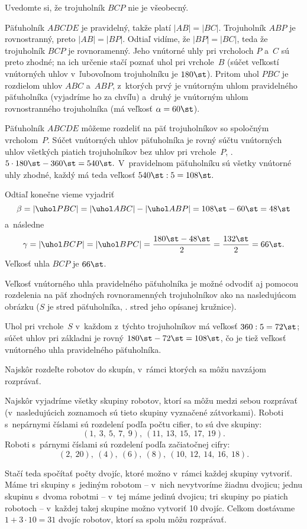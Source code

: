 {%
\napad
Uvedomte si, že trojuholník $BCP$ nie je všeobecný.

\riesenie
Päťuholník $ABCDE$ je pravidelný, takže platí $|AB|=|BC|$.
Trojuholník $ABP$ je rovnostranný, preto $|AB|=|BP|$.
Odtiaľ vidíme, že $|BP|=|BC|$, teda že trojuholník $BCP$ je rovnoramenný.
Jeho vnútorné uhly pri vrcholoch $P$ a~$C$ sú preto zhodné; na ich určenie
stačí poznať uhol pri vrchole~$B$
(súčet veľkostí vnútorných uhlov v~ľubovoľnom trojuholníku je $180\st$).
Pritom uhol $PBC$ je rozdielom uhlov $ABC$ a~$ABP$, z~ktorých prvý je
vnútorným uhlom pravidelného päťuholníka (vyjadríme ho za chvíľu) a~druhý je
vnútorným uhlom rovnostranného trojuholníka (má veľkosť $\alpha=60\st$).
%


Päťuholník $ABCDE$ môžeme rozdeliť na päť trojuholníkov so spoločným
vrcholom~$P$. Súčet vnútorných uhlov päťuholníka je rovný súčtu
vnútorných uhlov všetkých piatich trojuholníkov bez uhlov pri vrchole~$P$, \tj.
$
5\cdot 180\st -360\st =540\st.
$
V~pravidelnom päťuholníku sú všetky vnútorné uhly zhodné, každý má
teda veľkosť
$
540\st:5 =108\st.
$

Odtiaľ konečne vieme vyjadriť
$$
\beta=|\uhol PBC| =|\uhol ABC|-|\uhol ABP| =108\st-60\st =48\st
$$
a~následne
$$
\gamma=|\uhol BCP|=|\uhol BPC| =\frac{180\st-48\st}2 =\frac{132\st}2 =66\st.
$$
Veľkosť uhla $BCP$ je $66\st$.

\poznamka
Veľkosť vnútorného uhla pravidelného päťuholníka je možné odvodiť aj
pomocou rozdelenia na päť zhodných rovnoramenných trojuholníkov ako na
nasledujúcom obrázku ($S$ je stred päťuholníka, \tj. stred jeho opísanej
kružnice).
%


Uhol pri vrchole~$S$ v~každom z~týchto trojuholníkov má veľkosť
$360:5=72\st$; súčet uhlov pri základni je rovný $180\st-72\st=108\st$,
čo je tiež veľkosť vnútorného uhla pravidelného päťuholníka.
}

{%
\napad
Najskôr rozdeľte robotov do skupín, v~rámci ktorých sa môžu navzájom rozprávať.

\riesenie
Najskôr vyjadríme všetky skupiny robotov, ktorí sa môžu medzi sebou rozprávať
(v~nasledujúcich zoznamoch sú tieto skupiny vyznačené zátvorkami).
Roboti s~nepárnymi číslami sú rozdelení podľa počtu cifier, to sú dve skupiny:
$$
(1,\ 3,\ 5,\ 7,\ 9),\
(11,\ 13,\ 15,\ 17,\ 19).
$$
Roboti s~párnymi číslami sú rozdelení podľa začiatočnej cifry:
$$
(2,\ 20),\ (4),\ (6),\ (8),\ (10,\ 12,\ 14,\ 16,\ 18).
$$

Stačí teda spočítať počty dvojíc, ktoré možno v~rámci každej skupiny vytvoriť.
Máme tri skupiny s~jediným robotom -- v~nich nevytvoríme žiadnu dvojicu;
jednu skupinu s~dvoma robotmi -- v~tej máme jedinú dvojicu;
tri skupiny po piatich robotoch -- v~každej takej skupine možno vytvoriť 10 dvojíc.
Celkom dostávame $1+3\cdot 10=31$ dvojíc robotov, ktorí sa spolu môžu rozprávať.
}


